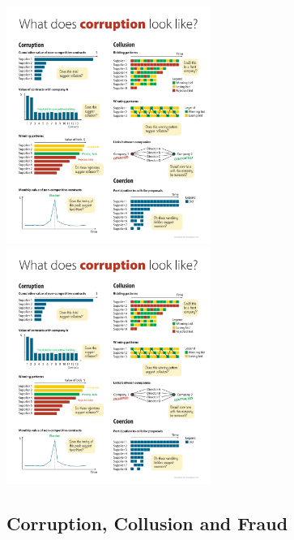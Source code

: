 \includegraphics[max width=0.5\textwidth]{../img/poster_monthly.pdf}
\includegraphics[max width=0.5\textwidth]{../img/poster_winning_patterns.pdf}

\cite{wb_poster}

\subsection{Corruption, Collusion and Fraud}\label{sec_intro_corruption}



